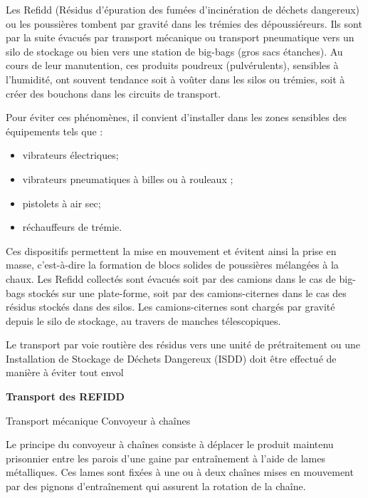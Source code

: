 Les Refidd (Résidus d’épuration des fumées d’incinération de déchets dangereux) ou les poussières tombent par gravité dans les trémies des dépoussiéreurs.
Ils sont par la suite évacués par transport mécanique ou transport pneumatique vers un silo de stockage ou bien vers une station de big-bags (gros sacs étanches). Au cours de leur manutention, ces produits poudreux (pulvérulents), sensibles à l’humidité, ont souvent tendance soit à voûter dans les silos ou trémies, soit à créer des bouchons dans les circuits de transport. 
\vspace{0.3cm}

Pour éviter ces phénomènes, il convient d’installer dans les zones sensibles des équipements tels que :

\begin{itemize}
\item vibrateurs électriques;
\item vibrateurs pneumatiques à billes ou à rouleaux ;
\item pistolets à air sec;
\item réchauffeurs de trémie.
\end{itemize}

Ces dispositifs permettent la mise en mouvement et évitent ainsi la prise en masse, c’est-à-dire la formation de blocs solides de poussières mélangées à la chaux.
Les Refidd collectés sont évacués soit par des camions dans le cas de big-bags stockés sur une plate-forme, soit par des camions-citernes dans le cas des résidus stockés dans des silos. Les camions-citernes sont chargés par gravité depuis le silo de stockage, au travers de manches télescopiques.
\vspace{0.3cm}

Le transport par voie routière des résidus vers une unité de prétraitement ou une Installation de Stockage de Déchets Dangereux (ISDD) doit être effectué de manière à éviter tout envol

\vspace{0.3cm}
\textbf{Transport des REFIDD}
\vspace{0.3cm}

Transport mécanique
Convoyeur à chaînes
\vspace{0.3cm}

Le principe du convoyeur à chaînes consiste à déplacer le produit maintenu prisonnier entre les parois d’une gaine par entraînement à l’aide de lames métalliques. Ces lames sont fixées à une ou à deux chaînes mises en mouvement par des pignons d’entraînement qui assurent la rotation de la chaîne.
\vspace{0.3cm}

